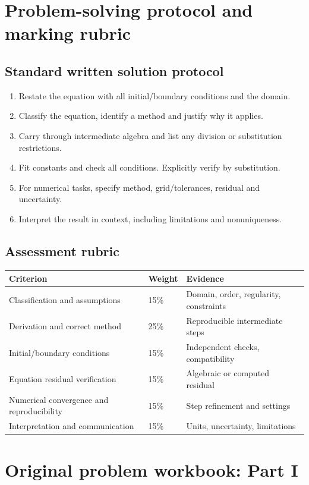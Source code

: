\documentclass[11pt,letterpaper,oneside]{report}
\theoremstyle{definition}\newtheorem{definition}[theorem]{Definition}
\theoremstyle{remark}\newtheorem{remark}[theorem]{Remark}
\begin{document}
\chapter{Problem-solving protocol and marking rubric}
\section{Standard written solution protocol}
\begin{enumerate}
\item Restate the equation with all initial/boundary conditions and the domain.
\item Classify the equation, identify a method and justify why it applies.
\item Carry through intermediate algebra and list any division or substitution restrictions.
\item Fit constants and check all conditions. Explicitly verify by substitution.
\item For numerical tasks, specify method, grid/tolerances, residual and uncertainty.
\item Interpret the result in context, including limitations and nonuniqueness.
\end{enumerate}
\section{Assessment rubric}
\begin{longtable}{>{\raggedright\arraybackslash}p{}p{}>{\raggedright\arraybackslash}p{}}
\toprule Criterion & Weight & Evidence \\ \midrule\endhead
Classification and assumptions & 15\% & Domain, order, regularity, constraints \\
Derivation and correct method & 25\% & Reproducible intermediate steps \\
Initial/boundary conditions & 15\% & Independent checks, compatibility \\
Equation residual verification & 15\% & Algebraic or computed residual \\
Numerical convergence and reproducibility & 15\% & Step refinement and settings \\
Interpretation and communication & 15\% & Units, uncertainty, limitations \\
\bottomrule
\end{longtable}
\chapter{Original problem workbook: Part I}
\end{document}

